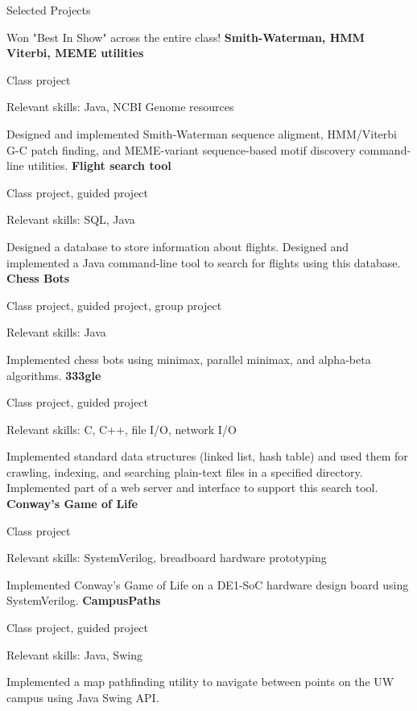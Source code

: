 \begin{rubric}{Selected Projects}
	\par Won "Best In Show" across the entire class!
\entry*[2018] %
	\textbf{Smith-Waterman, HMM Viterbi, MEME utilities} %
	\par Class project
	\par Relevant skills: Java, NCBI Genome resources
	\par Designed and implemented Smith-Waterman sequence aligment, HMM/Viterbi G-C patch finding, and MEME-variant sequence-based motif discovery command-line utilities.
\entry*[2018] %
	\textbf{Flight search tool} %
	\par Class project, guided project
	\par Relevant skills: SQL, Java
	\par Designed a database to store information about flights. Designed and implemented a Java command-line tool to search for flights using this database.
\entry*[2018] %
	\textbf{Chess Bots} %
	\par Class project, guided project, group project
	\par Relevant skills: Java
	\par Implemented chess bots using minimax, parallel minimax, and alpha-beta algorithms.
\entry*[2018] %
	\textbf{333gle} %
	\par Class project, guided project
	\par Relevant skills: C, C++, file I/O, network I/O
	\par Implemented standard data structures (linked list, hash table) and used them for crawling, indexing, and searching plain-text files in a specified directory. Implemented part of a web server and interface to support this search tool.
\entry*[2018] %
	\textbf{Conway's Game of Life} %
	\par Class project
	\par Relevant skills: SystemVerilog, breadboard hardware prototyping
	\par Implemented Conway's Game of Life on a DE1-SoC hardware design board using SystemVerilog.
\entry*[2018] %
	\textbf{CampusPaths} %
	\par Class project, guided project
	\par Relevant skills: Java, Swing
	\par Implemented a map pathfinding utility to navigate between points on the UW campus using Java Swing API.
\entry*[2017] %

\end{rubric}
